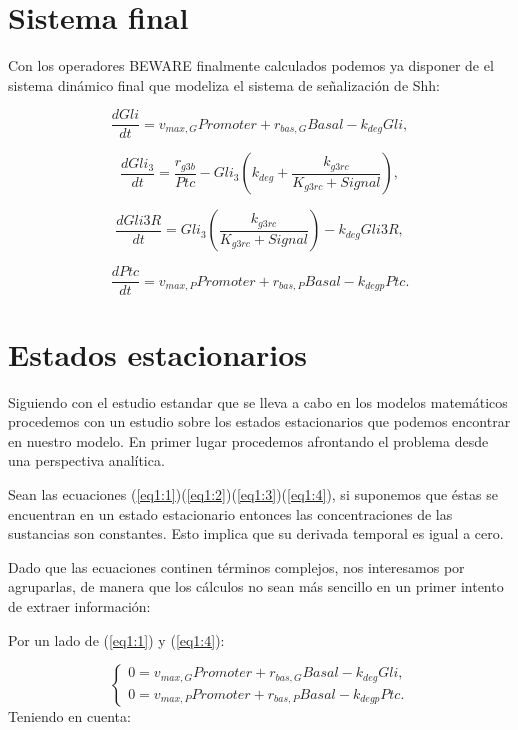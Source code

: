    
\section{Sistema final}
 Con los operadores BEWARE finalmente calculados podemos ya disponer de el sistema dinámico final que modeliza el sistema de señalización de Shh:
 
 \begin{equation}
 \frac{dGli}{dt} = v_{max,G}Promoter+r_{bas,G}Basal-k_{deg}Gli,
 \label{eq1:1}
 \end{equation}
 
 \begin{equation}
 \frac{dGli_3}{dt} = \frac{r_{g3b}}{Ptc}-Gli_3\left(k_{deg}+\frac{k_{g3rc}}{K_{g3rc}+Signal}\right),
 \label{eq1:2}
 \end{equation}
 
 \begin{equation}
 \frac{dGli3R}{dt}= Gli_3\left(\frac{k_{g3rc}}{K_{g3rc}+Signal}\right)-k_{deg}Gli3R,
 \label{eq1:3}
 \end{equation}
 
 \begin{equation}
 \frac{dPtc}{dt} = v_{max,P}Promoter+r_{bas,P}Basal-k_{degp}Ptc.
 \label{eq1:4}
 \end{equation}
 
\section{Estados estacionarios}\label{apartado2.4}
Siguiendo con el estudio estandar que se lleva a cabo en los modelos matemáticos procedemos con un estudio sobre los estados estacionarios que podemos encontrar en nuestro modelo. En primer lugar procedemos afrontando el problema desde una perspectiva analítica. 

Sean las ecuaciones (\ref{eq1:1})(\ref{eq1:2})(\ref{eq1:3})(\ref{eq1:4}), si suponemos que éstas se encuentran en un estado estacionario entonces las concentraciones de las sustancias son constantes. Esto implica que su derivada temporal es igual a cero.

Dado que las ecuaciones continen términos complejos, nos interesamos por agruparlas, de manera que los cálculos no sean más sencillo en un primer intento de extraer información:

Por un lado de (\ref{eq1:1}) y (\ref{eq1:4}):

$$\begin{cases} 0 = v_{max,G}Promoter+r_{bas,G}Basal-k_{deg}Gli, \\0= v_{max,P}Promoter+r_{bas,P}Basal-k_{degp}Ptc. \end{cases}$$
Teniendo en cuenta:

